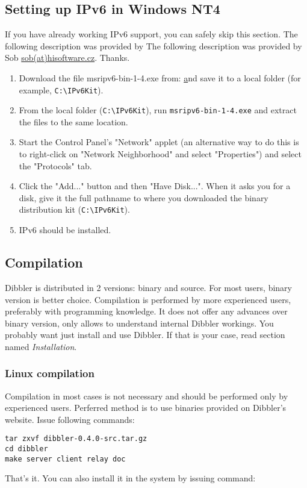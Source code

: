 \subsection{Setting up IPv6 in Windows NT4}
If you have already working IPv6 support, you can safely skip this section.
The following description was provided by The following description was provided by Sob
\href{mailto:sob(at)hisoftware.cz}{sob(at)hisoftware.cz}. Thanks.

\begin{enumerate}
  \item Download the file msripv6-bin-1-4.exe from:
    \href{http://research.microsoft.com/msripv6/msripv6.htm}
    and save it to a local folder (for example, \verb+C:\IPv6Kit+).
  \item From the local folder (\verb+C:\IPv6Kit+), run \verb+msripv6-bin-1-4.exe+ and extract the
    files to the same location.
  \item Start the Control Panel's "Network" applet (an alternative way to do this is
    to right-click on "Network Neighborhood" and select "Properties") and select
    the "Protocols" tab.
  \item Click the "Add..." button and then "Have Disk...". When it asks you for
    a disk, give it the full pathname to where you downloaded the binary
    distribution kit (\verb+C:\IPv6Kit+).
  \item IPv6 should be installed.
\end{enumerate}

\subsection{Compilation}
Dibbler is distributed in 2 versions: binary and source. For
most users, binary version is better choice.  Compilation is
performed by more experienced users, preferably with programming
knowledge. It does not offer any advances over binary version, only
allows to understand internal Dibbler workings. You probably want just
install and use Dibbler. If that is your case, read section
named \emph{Installation}.

\subsubsection{Linux compilation}

Compilation in most cases is not necessary and should be performed
only by experienced users. Perferred method is to use binaries
provided on Dibbler's website. Issue following commands:
\begin{verbatim}
tar zxvf dibbler-0.4.0-src.tar.gz
cd dibbler
make server client relay doc
\end{verbatim}
That's it. You can also install it in the system by issuing command:

